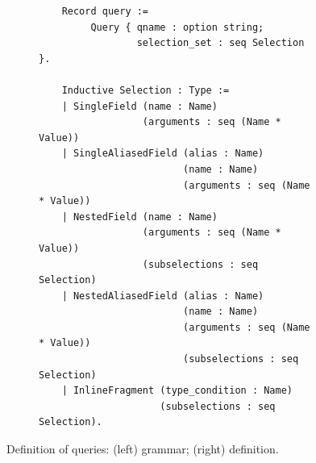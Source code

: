 \begin{figure}[t!]
\begin{subfigure}{.5\textwidth}
\begin{verbatim}
    Record query := 
         Query { qname : option string; 
                 selection_set : seq Selection }.
                   
    Inductive Selection : Type :=
    | SingleField (name : Name)
                  (arguments : seq (Name * Value))
    | SingleAliasedField (alias : Name)
                         (name : Name)
                         (arguments : seq (Name * Value))
    | NestedField (name : Name)
                  (arguments : seq (Name * Value))
                  (subselections : seq Selection)
    | NestedAliasedField (alias : Name)
                         (name : Name)
                         (arguments : seq (Name * Value))
                         (subselections : seq Selection)
    | InlineFragment (type_condition : Name)
                     (subselections : seq Selection).
    \end{verbatim}
  \end{subfigure}
  \caption{Definition of \gql queries:
  (left) \spec grammar; 
  (right) \gcoql definition. %
  } 
  \label{fig:query_def}
\end{figure}

